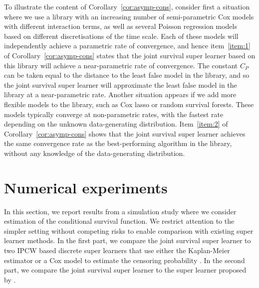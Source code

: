 \documentclass[lineno]{biometrika}
\newcommand{\1}{\mathds{1}}
\begin{document}
To illustrate the content of Corollary~\ref{cor:asymp-cons}, consider
first a situation where we use a library with an increasing number of
semi-parametric Cox models with different interaction terms, as well
as several Poisson regression models based on different
discretisations of the time scale. Each of these models will
independently achieve a parametric rate of convergence, and hence
item~\ref{item:1} of Corollary~\ref{cor:asymp-cons} states that the
joint survival super learner based on this library will achieve a
near-parametric rate of convergence. The constant \( C_P \) can be
taken equal to the distance to the least false model in the library,
and so the joint survival super learner will approximate the least
false model in the library at a near-parametric rate. Another
situation appears if we add more flexible models to the library, such
as Cox lasso or random survival forests. These models typically
converge at non-parametric rates, with the fastest rate depending on
the unknown data-generating distribution. Item~\ref{item:2} of
Corollary~\ref{cor:asymp-cons} shows that the joint survival super
learner achieves the same convergence rate as the best-performing
algorithm in the library, without any knowledge of the data-generating
distribution.

\section{Numerical experiments}
\label{sec:numer-exper}


In this section, we report results from a simulation study where we
consider estimation of the conditional survival function. We restrict
attention to the simpler setting without competing risks to enable
comparison with existing super learner methods. In the first part, we
compare the joint survival super learner to two IPCW based discrete
super learners that use either the Kaplan-Meier estimator or a Cox
model to estimate the censoring probability
\citep{gonzalez2021stacked}. In the second part, we compare the joint
survival super learner to the super learner proposed by
\cite{westling2021inference}.
\end{document}
